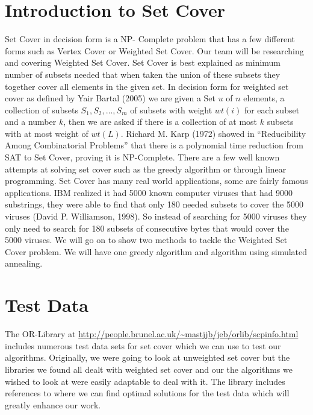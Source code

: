 \section{Introduction to Set Cover}

Set Cover in decision form is a NP- Complete problem that has a few different forms such as
Vertex Cover or Weighted Set Cover. Our team will be researching and covering Weighted Set Cover. Set Cover is best explained as minimum number of subsets needed that when taken the union of these subsets they together cover all elements in the given set. In decision form for weighted set cover as defined by Yair Bartal (2005) we are given a Set $u$ of $n$ elements, a collection of subsets $S_1,S_2,\ldots,S_m$ of subsets with weight $wt(i)$ for each subset and a number $k$, then we are asked if there is a collection of at most $k$ subsets with at most weight of $wt(L)$. %
Richard M. Karp (1972) showed in ``Reducibility Among Combinatorial Problems'' that there is a polynomial time reduction from SAT to Set Cover, proving it is NP-Complete. %
There are a few well known attempts at solving set cover such as the greedy algorithm or through linear programming. Set Cover has many real world applications, some are fairly famous applications. IBM realized it had 5000 known computer viruses that had 9000 substrings, they were able to find that only 180 needed subsets to cover the 5000 viruses (David P. Williamson, 1998). %
So instead of searching for 5000 viruses they only need to search for 180 subsets of consecutive bytes that would cover the 5000 viruses. We will go on to show two methods to tackle the Weighted Set Cover problem. We will have one greedy algorithm and algorithm using simulated annealing.

\section{Test Data}
The OR-Library at \url{http://people.brunel.ac.uk/~mastjjb/jeb/orlib/scpinfo.html} includes numerous test data sets for set cover which we can use to test our algorithms. Originally, we were going to look at unweighted set cover but the libraries we found all dealt with weighted set cover and our the algorithms we wished to look at were easily adaptable to deal with it. The library includes references to where we can find optimal solutions for the test data which will greatly enhance our work.

